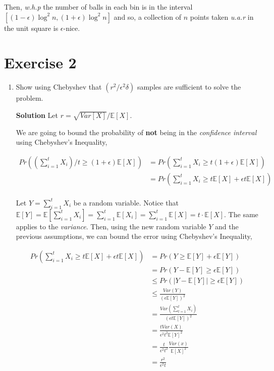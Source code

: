 \documentclass[12pt, a4paper]{article} %
\newcommand\expect[1]{\mathbb{E}[#1]}
\begin{document}
Then, \textit{w.h.p} the number of balls in each bin is in the interval ${[(1-\epsilon) \log^{2}n, (1 + \epsilon)\log^{2}n]}$ and so, a collection of $n$ points taken \textit{u.a.r} in the unit square is $\epsilon$-nice.


\section*{Exercise 2}%
\label{sec:exercise_2}

\begin{enumerate}[label=(\alph*)]
  \item Show using Chebyshev that $(r^{2}/\epsilon^{2}\delta)$ samples are sufficient to solve the problem.

  \textbf{Solution} Let $r = \sqrt{Var[X]}/\expect{X}$.

    We are going to bound the probability of \textbf{not} being in the \textit{confidence interval} using Chebyshev's Inequality,

    \begin{align*}
      Pr((\sum_{i=1}^{t}X_{i})/t \ge (1+\epsilon)\expect{X}) &=  Pr(\sum_{i=1}^{t}X_{i} \ge t(1+\epsilon)\expect{X}) \\
      &= Pr(\sum_{i=1}^{t}X_{i} \ge t\expect{X} + \epsilon t \expect{X}) \\
    \end{align*}

    Let $Y = \sum_{i=1}^{t}X_{i}$ be a random variable. Notice that $\expect{Y} = \expect{\sum_{i=1}^{t}X_{i}} = \sum_{i=1}^{t}\expect{X_{i}} = \sum_{i=1}^{t}\expect{X} = t \cdot \expect{X}$. The same applies to the \textit{variance}.
    Then, using the new random variable $Y$ and the previous assumptions, we can bound the error using Chebyshev's Inequality,


    \begin{align*}
      Pr(\sum_{i=1}^{t}X_{i} \ge t\expect{X} + \epsilon t \expect{X}) &= Pr (Y \ge \expect{Y} + \epsilon \expect{Y}) \\
      &= Pr (Y - \expect{Y} \ge \epsilon \expect{Y}) \\
      &\le Pr (|Y - \expect{Y}| \ge \epsilon \expect{Y}) \\
      &\le \frac{Var(Y)}{(\epsilon \expect{Y})^{2}} \\
      &= \frac{Var(\sum_{t=1}^{t}X_{i})}{(\epsilon t \expect{Y})^{2}} \\
      &= \frac{t Var (X)}{\epsilon^{2} t^{2} \expect{Y}^{2}} \\
      &= \frac{t}{\epsilon^{2} t^{2}} \frac{Var(x)}{\expect{X}^{2}} \\
      &= \frac{r^{2}}{\epsilon^{2} t}
    \end{align*}


\end{enumerate}
\end{document}
